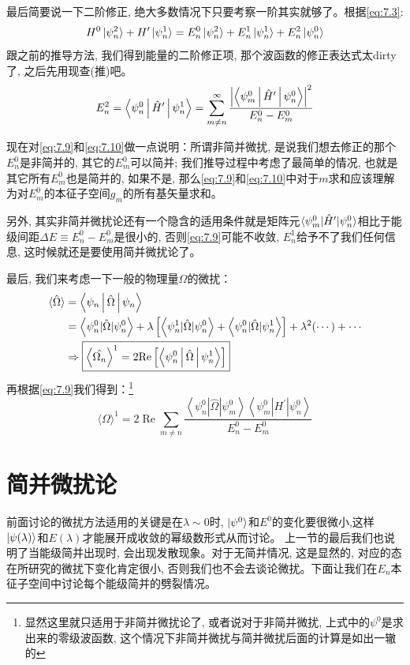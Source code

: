 \documentclass[a4paper,zihao=-4,linespread=1]{ctexrep}
\newenvironment{lequation}{\large\begin{equation}}{\end{equation}}
\begin{document}
    最后简要说一下二阶修正, 绝大多数情况下只要考察一阶其实就够了。根据\ref{eq:7.3}:
    \[H^0 \ket{\psi_n^2}+H^{\prime} \ket{\psi_n^1}=E_n^0 \ket{\psi_n^2}+E_n^1 \ket{\psi_n^1}+E_n^2 \ket{\psi_n^0}\]
    跟之前的推导方法, 我们得到能量的二阶修正项, 那个波函数的修正表达式太dirty了, 之后先用现查(推)吧。
    \begin{lequation}
        \label{eq:7.10}
        E_n^2=\Braket{\psi_n^0|\hat{H}^\prime|\psi_n^1}=\sum\limits_{m\neq n}^\infty\frac{\left|\Braket{\psi_m^0|\hat{H}^\prime|\psi_n^0}\right|^2}{E_n^0-E_m^0}
    \end{lequation}

    现在对\ref{eq:7.9}和\ref{eq:7.10}做一点说明：所谓非简并微扰, 是说我们想去修正的那个$E^0_n$是非简并的, 其它的$E^0_m$可以简并; 我们推导过程中考虑了最简单的情况,
    也就是其它所有$E^0_m$也是简并的, 如果不是, 那么\ref{eq:7.9}和\ref{eq:7.10}中对于$m$求和应该理解为对$E_m^0$的本征子空间$g_m$的所有基矢量求和。

    另外, 其实非简并微扰论还有一个隐含的适用条件就是矩阵元$\braket{\psi_m^0|\hat{H}^\prime|\psi_n^0}$相比于能级间距$\Delta E\equiv E_n^0-E_m^0$是很小的, 否则\ref{eq:7.9}可能不收敛, 
    $E_n^1$给予不了我们任何信息, 这时候就还是要使用简并微扰论了。

    最后, 我们来考虑一下一般的物理量$\Omega$的微扰：
    \begin{align*}
        \braket{\hat{\Omega}}&=\Braket{\psi_n|\hat{\Omega}|\psi_n}\\
        &=\left\langle\psi_{n}^{0}|\hat{\Omega}| \psi_{n}^{0}\right\rangle+\lambda\left[\left\langle\psi_{n}^{1}|\hat{\Omega}| \psi_{n}^{0}\right\rangle+\left\langle\psi_{n}^{0}|\hat{\Omega}| \psi_{n}^{1}\right\rangle\right]+\lambda^{2}(\cdots)+\cdots\\
        &\Rightarrow \boxed{\Braket{\hat{\Omega_n}}^1=2\mathrm{Re}\left[\Braket{\psi_n^0|\hat{\Omega}|\psi_n^1}\right]}
    \end{align*}
    再根据\ref{eq:7.9}我们得到：\footnote{显然这里就只适用于非简并微扰论了, 或者说对于非简并微扰, 上式中的$\psi^0$是求出来的零级波函数, 这个情况下非简并微扰与简并微扰后面的计算是如出一辙的}
    \begin{equation}
        \langle\Omega\rangle^{1}=2 \operatorname{Re} \sum_{m \neq n} \frac{\left\langle\psi_{n}^{0}|\hat{\Omega}| \psi_{m}^{0}\right\rangle\left\langle\psi_{m}^{0}\left|H^{\prime}\right| \psi_{n}^{0}\right\rangle}{E_{n}^{0}-E_{m}^{0}}
    \end{equation}
    \section{简并微扰论}
    前面讨论的微扰方法适用的关键是在$\lambda\sim0$时, $\ket{\psi^0}$和$E^0$的变化要很微小,这样$\ket{\psi(\lambda)}$和$E(\lambda)$才能展开成收敛的幂级数形式从而讨论。
    上一节的最后我们也说明了当能级简并出现时, 会出现发散现象。对于无简并情况, 这是显然的, 对应的态在所研究的微扰下变化肯定很小, 否则我们也不会去谈论微扰。下面让我们在$E_n$本征子空间中讨论每个能级简并的劈裂情况。
    
\end{document}

